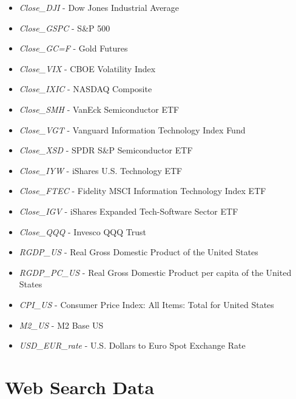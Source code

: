 \begin{itemize}
    \item \textit{Close\_DJI} - Dow Jones Industrial Average
    \item \textit{Close\_GSPC} - S\&P 500
    \item \textit{Close\_GC=F} - Gold Futures
    \item \textit{Close\_VIX} - CBOE Volatility Index
    \item \textit{Close\_IXIC} - NASDAQ Composite
    \item \textit{Close\_SMH} - VanEck Semiconductor ETF
    \item \textit{Close\_VGT} - Vanguard Information Technology Index Fund
    \item \textit{Close\_XSD} - SPDR S\&P Semiconductor ETF
    \item \textit{Close\_IYW} - iShares U.S. Technology ETF
    \item \textit{Close\_FTEC} - Fidelity MSCI Information Technology Index ETF
    \item \textit{Close\_IGV} - iShares Expanded Tech-Software Sector ETF
    \item \textit{Close\_QQQ} - Invesco QQQ Trust
    \item \textit{RGDP\_US} - Real Gross Domestic Product of the United States
    \item \textit{RGDP\_PC\_US} - Real Gross Domestic Product per capita 
    of the United States
    \item \textit{CPI\_US} - Consumer Price Index: All Items: Total for United States
    \item \textit{M2\_US} - M2 Base US
    \item \textit{USD\_EUR\_rate} - U.S. Dollars to Euro Spot Exchange Rate
\end{itemize}


\section{Web Search Data}

